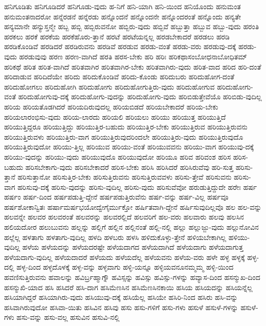 {ಹನಿಗೂಡಿತು
ಹನಿಗೂಡಿದರೆ
ಹನಿಗೂಡು-ವುದು
ಹ-ನಿಗೆ
ಹನಿ-ಯಾಗಿ
ಹನಿ-ಯಿಂದ
ಹನಿಯೊಂದು
ಹನುಮಂತ
ಹನುಮಂತನಾದರೋ
ಹನ್ನೆರಡನೆ
ಹನ್ನೆರಡು
ಹನ್ನೊಂದನೆ
ಹನ್ನೊಂದನೇ
ಹನ್ನೊಂದರಂತೆ
ಹನ್ನೊಂದು
ಹನ್ಯತೇ
ಹನ್ಯಮಾನೇ
ಹನ್ಯುಸ್ತನ್ಮೇ
ಹಬ್ಬ
ಹಬ್ಬಿ
ಹಬ್ಬಿರುವನೋ
ಹಬ್ಬಿರು-ವುದು
ಹಬ್ಬಿವೆ
ಹಬ್ಬುತ್ತಾ
ಹಬ್ಬುವ
ಹಬ್ಬು-ವುದು
ಹರಂತಿ
ಹರಕಲು
ಹರಕೆ
ಹರಕೆಯ
ಹರಕೆಹೊರು-ತ್ತಾನೆ
ಹರಟೆ
ಹರಟೆಯನ್ನಲ್ಲ
ಹರಡಬೇಕಾದರೆ
ಹರಡಲು
ಹರಡಿ
ಹರಡಿಕೊಂಡಿವೆ
ಹರಡಿದರೆ
ಹರಡಿರುವನು
ಹರಡಿವೆ
ಹರಡುವ
ಹರಡು-ವಂತೆ
ಹರಡು-ವರು
ಹರಡುವು-ದಕ್ಕೆ
ಹರಡು-ವುದು
ಹರಡುವುವು
ಹರಣ
ಹರಣ-ವಾಗಿದೆ
ಹರತಿ
ಹರಸ-ಬೇಕು
ಹರಿ
ಹರಿಃ
ಹರಿಕಥಾಸಂಬೋಧನಾಬೋಧಿತಮ್
ಹರಿಕಥೆ
ಹರಿತ
ಹರಿತ-ವಾಗಿದೆ
ಹರಿತವಾಗಿರ
ಹರಿತವಾಗಿರ-ಬೇಕು
ಹರಿತವಾಗಿರು-ವುದು
ಹರಿತ-ವಾದ
ಹರಿದ
ಹರಿ-ದಂತೆ
ಹರಿದಾಡುವ
ಹರಿದಿದೆಯೇ
ಹರಿದು
ಹರಿದುಕೊಂಡಿವೆ
ಹರಿದು-ಕೊಂಡು
ಹರಿದುಬರು
ಹರಿದುಹೋಗ-ದಂತೆ
ಹರಿದುಹೋಗಲು
ಹರಿದುಹೋಗಿ
ಹರಿದುಹೋಗು
ಹರಿದುಹೋಗುತ್ತಿರು-ವುದು
ಹರಿದುಹೋಗುವ
ಹರಿದುಹೋಗು-ವಂತೆ
ಹರಿದುಹೋಗುವು-ದಕ್ಕೆ
ಹರಿದುಹೋಗು-ವುದನ್ನು
ಹರಿದುಹೋಗು-ವುದು
ಹರಿಬಿಡುತ್ತೇವೆಯೊ
ಹರಿಬಿಡು-ವುದಿಲ್ಲ
ಹರಿಯ
ಹರಿಯತೊಡಗಿದರೆ
ಹರಿಯದಿರುವುದಲ್ಲ
ಹರಿಯಬಿಡದೆ
ಹರಿಯಬೇಕಾದರೆ
ಹರಿಯ-ಬೇಕು
ಹರಿಯಲಾರಂಭಿಸು-ವುದು
ಹರಿಯ-ಲಾರದು
ಹರಿಯಲಿ
ಹರಿಯಲು
ಹರಿಯು
ಹರಿಯುತ್ತ
ಹರಿಯುತ್ತಿದೆ
ಹರಿಯುತ್ತಿದ್ದರೂ
ಹರಿಯುತ್ತಿದ್ದು
ಹರಿಯುತ್ತಿರ-ಬಹುದು
ಹರಿಯುತ್ತಿರ-ಬೇಕು
ಹರಿಯುತ್ತಿರುವ
ಹರಿಯುತ್ತಿರುವನು
ಹರಿಯುತ್ತಿರುವಳು
ಹರಿಯುತ್ತಿರು-ವಾಗ
ಹರಿಯುತ್ತಿರುವುದರಿಂದಲೇ
ಹರಿಯುತ್ತಿರು-ವುದು
ಹರಿಯುತ್ತಿರುವುದೊ
ಹರಿಯುತ್ತಿರುವುದೋ
ಹರಿಯು-ತ್ತಿಲ್ಲ
ಹರಿಯುವ
ಹರಿಯು-ವಂತೆ
ಹರಿಯುವವನು
ಹರಿಯು-ವಾಗ
ಹರಿಯುವು-ದಕ್ಕೆ
ಹರಿಯು-ವುದನ್ನು
ಹರಿಯು-ವುದು
ಹರಿಯುವುದೊ
ಹರಿಯುವುದೋ
ಹರಿಯೂ
ಹರಿವ
ಹರಿವಂಶ
ಹರಿಸ
ಹರಿಸ-ಬಹುದು
ಹರಿಸಬೇಕಾಗು-ವುದು
ಹರಿಸಬೇಕಾದರೆ
ಹರಿಸ-ಬೇಕು
ಹರಿಸಿ
ಹರಿಸಿದರೆ
ಹರಿಸಿರುವೆವು
ಹರಿ-ಸುತ್ತ
ಹರಿಸು-ತ್ತಾನೆ
ಹರಿಸುತ್ತಾನೋ
ಹರಿಸುತ್ತಿರ-ಬೇಕು
ಹರಿಸುತ್ತಿರುವನು
ಹರಿಸುತ್ತಿರುವವಳು
ಹರಿಸು-ತ್ತೇವೆ
ಹರಿಸುವನು
ಹರಿಸು-ವಾಗ
ಹರಿಸುವು-ದಕ್ಕೆ
ಹರಿಸು-ವುದನ್ನು
ಹರಿಸು-ವುದಿಲ್ಲ
ಹರಿಸು-ವುದು
ಹರಿಸುವೆವೋ
ಹರುಡುತ್ತಿದ್ದುದೇ
ಹರೇಃ
ಹರ್ಷ
ಹರ್ಷಂ
ಹರ್ಷ-ದಿಂದ
ಹರ್ಷಪಡುತ್ತಿ-ದ್ದೇನೆ
ಹರ್ಷಪಡುತ್ತಿರುವೆನು
ಹರ್ಷ-ವನ್ನು
ಹರ್ಷ-ವಿಲ್ಲ
ಹರ್ಷವೂ
ಹರ್ಷಶೋಕಾನ್ವಿತಃ
ಹರ್ಷಾಮರ್ಷಭಯೋದ್ವೇಗೈರ್ಮುಕ್ತೋ
ಹರ್ಷಿತವಾಗಿ-ದ್ದೇನೆ
ಹರ್ಷಿಸುವುದಿಲ್ಲವೊ
ಹಲ
ಹಲ-ವನ್ನು
ಹಲವನ್ನೇ
ಹಲವರ
ಹಲವರಂತೆ
ಹಲವರನ್ನು
ಹಲವರಲ್ಲಿದೆ
ಹಲವರಿಗೆ
ಹಲ-ವರು
ಹಲವಾರು
ಹಲವು
ಹಲಸಿನ
ಹಲಿಯದೋರ
ಹಲುಬುವನು
ಹಲ್ಲನ್ನು
ಹಲ್ಲಿಗೆ
ಹಲ್ಲಿನ
ಹಲ್ಲಿನಂತೆ
ಹಲ್ಲಿ-ನಲ್ಲಿ
ಹಲ್ಲು
ಹಲ್ಲುಜ್ಜು-ವುದು
ಹಲ್ಲುನೋವಿನ
ಹಲ್ಲೆಲ್ಲ
ಹಳತಾಗು
ಹಳತಾಗು-ವುದಿಲ್ಲ
ಹಳದಿ
ಹಳಬರು
ಹಳಸಿ
ಹಳಿದುಕೊಳ್ಳು-ತ್ತೇನೆ
ಹಳಿಯಬೇಕಾಗಿಲ್ಲ
ಹಳಿಯು-ವುದಿಲ್ಲ
ಹಳೆಯ
ಹಳೆಯದನ್ನು
ಹಳೆಯದರಷ್ಟೇ
ಹಳೆಯದಾಗದ
ಹಳೆಯದಾಗಿದೆ
ಹಳೆಯದಾಗು
ಹಳೆಯದಾಗುತ್ತ
ಹಳೆಯದಾಗು-ವುದಿಲ್ಲ
ಹಳೆಯದಾದರೆ
ಹಳೆಯದು
ಹಳೆಯದೆಲ್ಲ
ಹಳೆಯವನು
ಹಳೆಯ-ವರು
ಹಳೇ
ಹಳ್ಳ
ಹಳ್ಳಕ್ಕೆ
ಹಳ್ಳ-ದಲ್ಲಿ
ಹಳ್ಳ-ದಿಂದ
ಹಳ್ಳದೊಳಕ್ಕೆ
ಹಳ್ಳ-ವನ್ನು
ಹಳ್ಳವಾಗು
ಹಳ್ಳಿ-ಯನ್ನೂ
ಹಳ್ಳಿಯವನೂನಮ್ಮಮ್ಮ
ಹಳ್ಳಿ-ಯಿಂದ
ಹವಣಿಸುತ್ತಿರುವನು
ಹವಾಲನ್ನು
ಹವಿರ್ಬ್ರಹ್ಮಾಗ್ನೌ
ಹವಿಸ್ಸನ್ನು
ಹವಿಸ್ಸು
ಹವಿಸ್ಸು-ಗಳನ್ನು
ಹವ್ಯಾಸ-ದಿಂದ
ಹಸನ್ಮುಖ-ದಿಂದ
ಹಸನ್ಮುಖಿ-ಯಾದ
ಹಸಿ
ಹಸಿದರೆ
ಹಸಿ-ದಾಗ
ಹಸಿಮೆಣಸಿನ
ಹಸಿಮೆಣಸಿನಕಾಯಿ
ಹಸಿಯ
ಹಸಿಯದನ್ನು
ಹಸಿಯನ್ನೆಲ್ಲ
ಹಸಿಯಾಗಿದ್ದರೆ
ಹಸಿಯಾಗಿರು-ವುದು
ಹಸಿಯುವು-ದಕ್ಕೆ
ಹಸಿಯೆಲ್ಲ
ಹಸಿಯೇ
ಹಸಿರಿ-ನಿಂದ
ಹಸಿರು
ಹಸಿ-ವನ್ನು
ಹಸಿವಾಗಿರುವುದೋ
ಹಸಿವಾ-ಯಿತು
ಹಸಿವಿನ
ಹಸಿವು
ಹಸು
ಹಸು-ಗಳಿಗೆ
ಹಸು-ಗಳು
ಹಸುಳೆ
ಹಸುಳೆ-ಗಳನ್ನು
ಹಸುಳೆ-ಗಳು
ಹಸು-ವನ್ನು
ಹಸು-ವಲ್ಲ
ಹಸುವಿನ
ಹಸುವಿ-ನಲ್ಲಿ
}
